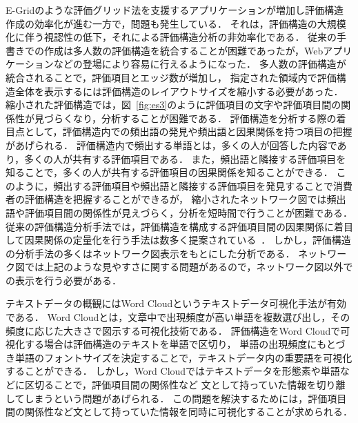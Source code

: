 \documentclass[syuuron]{kuee}
\begin{document}
	E-Gridのような評価グリッド法を支援するアプリケーションが増加し評価構造作成の効率化が進む一方で，問題も発生している．
	それは，評価構造の大規模化に伴う視認性の低下，それによる評価構造分析の非効率化である．
	従来の手書きでの作成は多人数の評価構造を統合することが困難であったが，Webアプリケーションなどの登場により容易に行えるようになった．
	多人数の評価構造が統合されることで，評価項目とエッジ数が増加し，
	指定された領域内で評価構造全体を表示するには評価構造のレイアウトサイズを縮小する必要があった． 
	縮小された評価構造では，図~\ref{fig:es3}のように評価項目の文字や評価項目間の関係性が見づらくなり，分析することが困難である．
	評価構造を分析する際の着目点として，評価構造内での頻出語の発見や頻出語と因果関係を持つ項目の把握があげられる．
	評価構造内で頻出する単語とは，多くの人が回答した内容であり，多くの人が共有する評価項目である．
	また，頻出語と隣接する評価項目を知ることで，多くの人が共有する評価項目の因果関係を知ることができる．
	このように，頻出する評価項目や頻出語と隣接する評価項目を発見することで消費者の評価構造を把握することができるが，
	縮小されたネットワーク図では頻出語や評価項目間の関係性が見えづらく，分析を短時間で行うことが困難である．
	従来の評価構造分析手法では，評価構造を構成する評価項目間の因果関係に着目して因果関係の定量化を行う手法は数多く提案されている~\cite{egm8}\cite{egm9}．
	しかし，評価構造の分析手法の多くはネットワーク図表示をもとにした分析である．
	ネットワーク図では上記のような見やすさに関する問題があるので，ネットワーク図以外での表示を行う必要がある．
	
	テキストデータの概観にはWord Cloudというテキストデータ可視化手法が有効である．
	Word Cloudとは，文章中で出現頻度が高い単語を複数選び出し，その頻度に応じた大きさで図示する可視化技術である\cite{wc1}．
	評価構造をWord Cloudで可視化する場合は評価構造のテキストを単語で区切り，
	単語の出現頻度にもとづき単語のフォントサイズを決定することで，テキストデータ内の重要語を可視化することができる．
	しかし，Word Cloudではテキストデータを形態素や単語などに区切ることで，評価項目間の関係性など
	文として持っていた情報を切り離してしまうという問題があげられる．
	この問題を解決するためには，評価項目間の関係性など文として持っていた情報を同時に可視化することが求められる．
	
\end{document}
